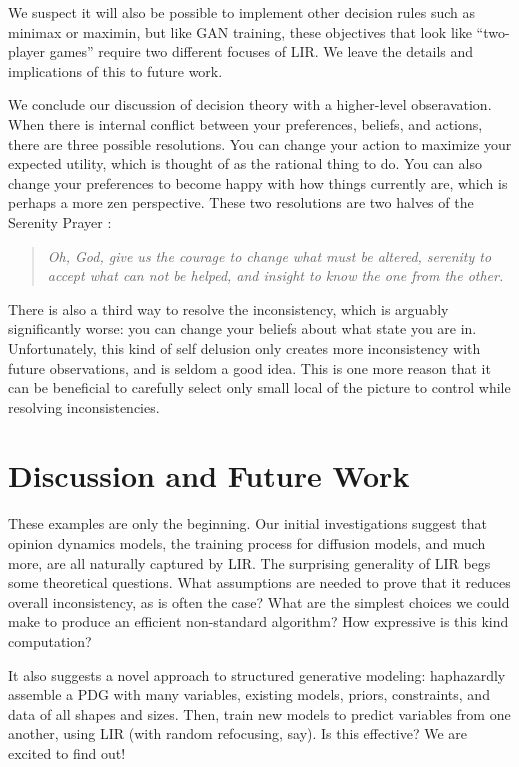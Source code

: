 {We suspect it will also be possible to implement other decision rules such as minimax or maximin, but like GAN training, these objectives that look like ``two-player games'' require two different focuses of LIR. 
We leave the details and implications of this to future work.

We conclude our discussion of decision theory with a higher-level obseravation. 
When there is internal conflict between your preferences, beliefs, and actions, there are three possible resolutions.  You can change your action to maximize your expected utility, which is thought of as the rational thing to do.
You can also change your preferences to become happy with how things currently are, which is perhaps a more zen perspective. 
These two resolutions are two halves of the Serenity Prayer \citep{serenity-prayer}:

\begin{quotation}\it
    Oh, God, give us the courage to change what must be altered, serenity to accept what can not be helped, and insight to know the one from the other.
\end{quotation}

There is also a third way to resolve the inconsistency, which is arguably significantly worse: you can change your beliefs about what state you are in. 
Unfortunately, this kind of self delusion only creates more inconsistency with future observations, and is seldom a good idea.  
This is one more reason that it can be beneficial to carefully select only small local of the picture to control while resolving inconsistencies.
}%


\section{Discussion and Future Work}

These examples are only the beginning.
Our initial investigations suggest that
opinion dynamics models,
the training process for diffusion models,
and much more, are all naturally captured by LIR.
%
The surprising generality of LIR begs some theoretical questions.
What assumptions are needed to prove that it reduces overall inconsistency,
    as is often the case?
What are the simplest choices we could make to produce an efficient
    non-standard algorithm?
How expressive is this kind computation?

It also suggests a novel approach to structured generative modeling:
haphazardly assemble a PDG with many variables, existing models, priors,
    constraints, and data of all shapes and sizes.
Then, train new models to predict variables from one another,
    using LIR (with random refocusing, say).
Is this effective?  We are excited to find out!

